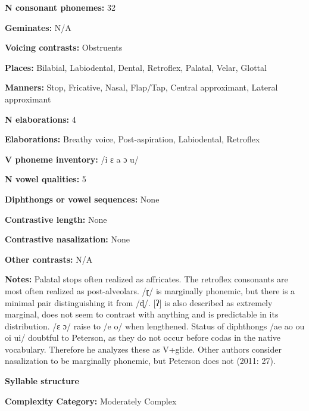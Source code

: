 \textbf{N consonant phonemes:} 32



\textbf{Geminates:} N/A



\textbf{Voicing contrasts:} Obstruents



\textbf{Places:} Bilabial, Labiodental, Dental, Retroflex, Palatal, Velar, Glottal



\textbf{Manners:} Stop, Fricative, Nasal, Flap/Tap, Central approximant, Lateral approximant



\textbf{N elaborations:} 4



\textbf{Elaborations:} Breathy voice, Post-aspiration, Labiodental, Retroflex



\textbf{V phoneme inventory:} /i ɛ a ɔ u/



\textbf{N vowel qualities:} 5



\textbf{Diphthongs or vowel sequences:} None



\textbf{Contrastive length:} None



\textbf{Contrastive nasalization:} None



\textbf{Other contrasts:} N/A



\textbf{Notes:} Palatal stops often realized as affricates. The retroflex consonants are most often realized as post-alveolars. /ɽ/ is marginally phonemic, but there is a minimal pair distinguishing it from /ɖ/. [ʔ] is also described as extremely marginal, does not seem to contrast with anything and is predictable in its distribution. /ɛ ɔ/ raise to /e o/ when lengthened. Status of diphthongs /ae ao ou oi ui/ doubtful to Peterson, as they do not occur before codas in the native vocabulary. Therefore he analyzes these as V+glide. Other authors consider nasalization to be marginally phonemic, but Peterson does not (2011: 27).



\textbf{Syllable structure}



\textbf{Complexity Category:} Moderately Complex



